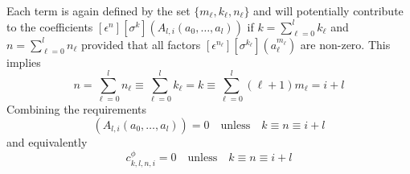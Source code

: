 \documentclass[a4paper]{amsart}
\begin{document}
Each term is again defined by the set $\{m_\ell,k_\ell,n_\ell\}$ and will potentially contribute to the coefficients $[\epsilon^n][\sigma^k](A_ {l,i}(a_0,\dots,a_l))$ if $k=\sum_{\ell=0}^l k_\ell$ and $n=\sum_{\ell=0}^l n_\ell$ provided that all factors $[\epsilon^{n_\ell}][\sigma^{k_\ell}](a^{m_\ell}_{\ell})$ are non-zero. This implies
\begin{equation*}
n=\sum_{\ell=0}^l n_\ell\equiv \sum_{\ell=0}^l k_\ell=k\equiv \sum_{\ell=0}^l(\ell+1)m_\ell=i+l
\end{equation*}
Combining the requirements
\begin{equation*}
[\epsilon^n][\sigma^k](A_ {l,i}(a_0,\dots,a_l))=0\quad\text{unless}\quad k\equiv n\equiv i+l
\end{equation*}
and equivalently
\begin{equation}\label{eq:parity_base}
c^{\phi}_{k,l,n,i}=0\quad\text{unless}\quad k\equiv n\equiv i+l
\end{equation}
\end{document}

